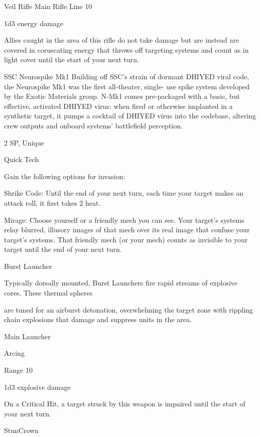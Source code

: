 Veil Rifle  
Main Rifle  
Line 10
 
1d3 energy damage
 
Allies caught in the area of this rifle do not take damage but are instead are covered in  
coruscating energy that throws off targeting systems and count as in light cover until the start of  
your next turn.
 

SSC Neurospike Mk1  
Building off SSC’s strain of dormant DHIYED viral code, the Neurospike Mk1 was the first all-theater, single- 
use spike system developed by the Exotic Materials group. N-Mk1 comes pre-packaged with a basic, but  
effective, activated DHIYED virus: when fired or otherwise implanted in a synthetic target, it pumps a  
cocktail of DHIYED virus into the codebase, altering crew outputs and onboard systems’ battlefield  
perception.    

2 SP, Unique
 
Quick Tech
 
Gain the following options for invasion:
 
         Shrike Code: Until the end of your next turn, each time your target makes an attack roll,  
         it first takes 2 heat.
 
         Mirage: Choose yourself or a friendly mech you can see. Your target’s systems relay  
         blurred, illusory images of that mech over its real image that confuse your target’s  
         systems. That friendly mech (or your mech) counts as invisible to your target until the end  
         of your next turn.
 

Burst Launcher  

Typically dorsally mounted, Burst Launchers fire rapid streams of explosive cores. These thermal spheres  

are tuned for an airburst detonation, overwhelming the target zone with rippling chain explosions that  
damage and suppress units in the area.   

Main Launcher
 
Arcing
 
Range 10
 

                                                                                                                


1d3 explosive damage
 
On a Critical Hit, a target struck by this weapon is impaired until the start of your next turn.
 

StunCrown
 

